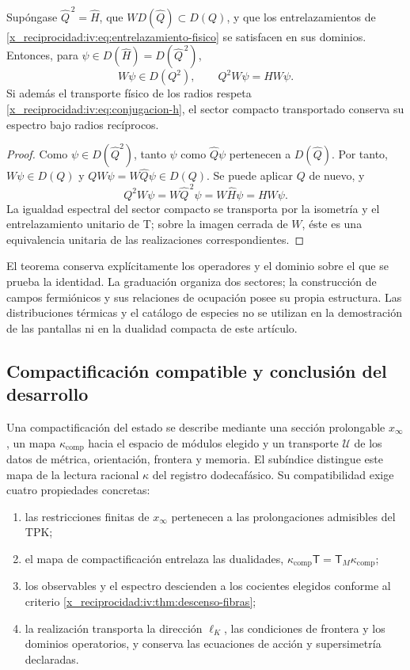 \begin{theorem}
\label{x_reciprocidad:iv:thm:supercarga-transporte}
Supóngase \(\widehat Q^{\,2}=\widehat H\), que
\(W D(\widehat Q)\subset D(Q)\), y que los
entrelazamientos de \eqref{x_reciprocidad:iv:eq:entrelazamiento-fisico}
se satisfacen en sus dominios. Entonces, para
\(\psi\in D(\widehat H)=D(\widehat Q^{\,2})\),
\[
 W\psi\in D(Q^2),\qquad Q^2W\psi=HW\psi.
\]
Si además el transporte físico de los radios respeta
\eqref{x_reciprocidad:iv:eq:conjugacion-h}, el sector compacto
transportado conserva su espectro bajo radios recíprocos.
\end{theorem}
\begin{proof}
Como \(\psi\in D(\widehat Q^2)\), tanto
\(\psi\) como \(\widehat Q\psi\) pertenecen
a \(D(\widehat Q)\). Por tanto, \(W\psi\in D(Q)\)
y \(QW\psi=W\widehat Q\psi\in D(Q)\). Se puede
aplicar \(Q\) de nuevo, y
\[
 Q^2W\psi=W\widehat Q^{\,2}\psi
          =W\widehat H\psi=HW\psi.
\]
La igualdad espectral del sector compacto se transporta
por la isometría y el entrelazamiento unitario de T;
sobre la imagen cerrada de \(W\), éste es una
equivalencia unitaria de las realizaciones correspondientes.
\end{proof}

El teorema conserva explícitamente los operadores y el
dominio sobre el que se prueba la identidad. La
graduación organiza dos sectores; la construcción de
campos fermiónicos y sus relaciones de ocupación posee
su propia estructura. Las distribuciones térmicas y el
catálogo de especies no se utilizan en la demostración
de las pantallas ni en la dualidad compacta de este
artículo.

\subsection{Compactificación compatible y conclusión del desarrollo}

Una compactificación del estado se describe mediante
una sección prolongable \(x_\infty\), un mapa
\(\kappa_{\mathrm{comp}}\) hacia el espacio de módulos
elegido y un transporte \(\mathcal U\) de los datos
de métrica, orientación, frontera y memoria. El
subíndice distingue este mapa de la lectura racional
\(\kappa\) del registro dodecafásico. Su compatibilidad
exige cuatro propiedades concretas:
\begin{enumerate}
\item las restricciones finitas de \(x_\infty\)
      pertenecen a las prolongaciones admisibles del TPK;
\item el mapa de compactificación entrelaza las dualidades,
      \(\kappa_{\mathrm{comp}}\mathsf T
        =\mathsf T_M\kappa_{\mathrm{comp}}\);
\item los observables y el espectro descienden a los
      cocientes elegidos conforme al criterio
      \ref{x_reciprocidad:iv:thm:descenso-fibras};
\item la realización transporta la dirección
      \(\ell_K\), las condiciones de frontera y los
      dominios operatorios, y conserva las ecuaciones
      de acción y supersimetría declaradas.
\end{enumerate}

